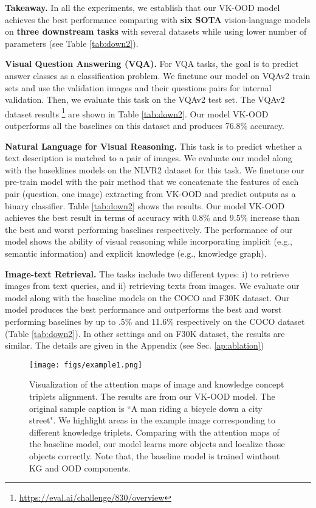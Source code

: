 \documentclass{article}
\begin{document}
{\bf Takeaway.} In all the experiments, we establish that our VK-OOD model achieves the best performance comparing with \textbf{six SOTA} vision-language models on \textbf{three downstream tasks} with several datasets while using lower number of parameters (see Table \ref{tab:down2}).



\textbf{Visual Question Answering (VQA).} For VQA tasks, the goal is to predict answer classes as a classification problem.  We finetune our model on VQAv2 train sets and use the validation images and their questions pairs for internal validation. Then, we evaluate this task on the VQAv2 test set. The VQAv2 dataset results \footnote{\url{https://eval.ai/challenge/830/overview}} are shown in Table \ref{tab:down2}. Our model VK-OOD outperforms all the baselines on this dataset and produces 76.8\% accuracy. 





\textbf{Natural Language for Visual Reasoning.} This task is to predict whether a text description is matched to a pair of images. We evaluate our model along with the baseklines models on the NLVR2 dataset for this task. We finetune our pre-train model with the pair method that we concatenate the features of each pair (question, one image) extracting from VK-OOD and predict outputs as a binary classifier. Table \ref{tab:down2} shows the results. 
Our model VK-OOD achieves the best result in terms of accuracy with 0.8\% and 9.5\% increase than the best and worst performing baselines respectively. The performance of our model shows the ability of visual reasoning while incorporating implicit (e.g., semantic information) and explicit knowledge (e.g., knowledge graph).


\textbf{Image-text Retrieval.} The tasks include two different types: i) to retrieve images from text queries, and ii) retrieving texts from images. We evaluate our model along with the baseline models on the COCO and F30K dataset. 
Our model produces the best performance and outperforms the best and worst performing baselines by up to .5\% and 11.6\% respectively on the COCO dataset (Table \ref{tab:down2}). In other settings and on F30K dataset, the results are similar. The details are given in the Appendix (see Sec. \ref{ap:ablation})




\begin{figure}
\texttt{[image: figs/example1.png]}

\centering
\caption{Visualization of the attention maps of image and knowledge concept triplets alignment. The results are from our VK-OOD model. The original sample caption is ``A man riding a bicycle down a city street". We highlight areas in the example image corresponding to different knowledge triplets. Comparing with the attention maps of the baseline model, our model learns more objects and localize those objects correctly. Note that, the baseline model is trained winthout KG and OOD components.\label{fig:example1}}
\end{figure}
\end{document}

